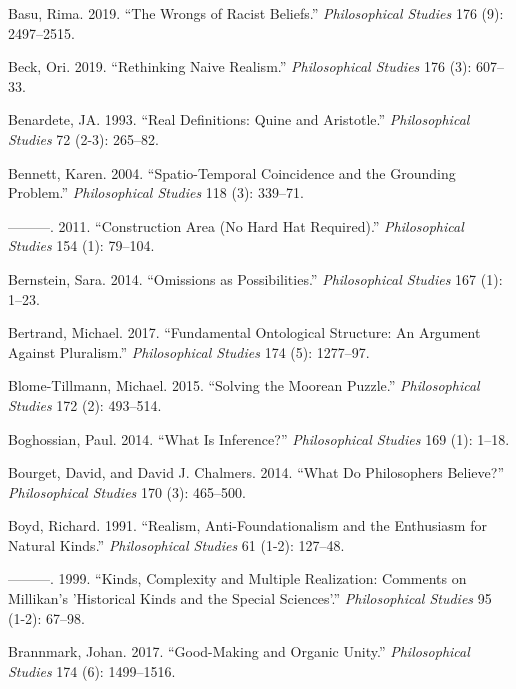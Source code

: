 \documentclass[
  10pt,
  letterpaper,
  DIV=11,
  numbers=noendperiod,
  twoside]{scrartcl}
\newlength{\cslhangindent}
\newenvironment{CSLReferences}[2] %
 {\begin{list}{}{%
  \setlength{\itemindent}{0pt}
  \setlength{\leftmargin}{0pt}
  \setlength{\parsep}{0pt}
  \ifodd #1
   \setlength{\leftmargin}{\cslhangindent}
   \setlength{\itemindent}{-1\cslhangindent}
  \fi
  \setlength{\itemsep}{#2\baselineskip}}}
 {\end{list}}
\begin{document}
\begin{CSLReferences}{1}{0}
Basu, Rima. 2019. {``The Wrongs of Racist Beliefs.''}
\emph{Philosophical Studies} 176 (9): 2497--2515.

Beck, Ori. 2019. {``Rethinking Naive Realism.''} \emph{Philosophical
Studies} 176 (3): 607--33.

Benardete, JA. 1993. {``Real Definitions: Quine and Aristotle.''}
\emph{Philosophical Studies} 72 (2-3): 265--82.

Bennett, Karen. 2004. {``Spatio-Temporal Coincidence and the Grounding
Problem.''} \emph{Philosophical Studies} 118 (3): 339--71.

---------. 2011. {``Construction Area (No Hard Hat Required).''}
\emph{Philosophical Studies} 154 (1): 79--104.

Bernstein, Sara. 2014. {``Omissions as Possibilities.''}
\emph{Philosophical Studies} 167 (1): 1--23.

Bertrand, Michael. 2017. {``Fundamental Ontological Structure: An
Argument Against Pluralism.''} \emph{Philosophical Studies} 174 (5):
1277--97.

Blome-Tillmann, Michael. 2015. {``Solving the Moorean Puzzle.''}
\emph{Philosophical Studies} 172 (2): 493--514.

Boghossian, Paul. 2014. {``What Is Inference?''} \emph{Philosophical
Studies} 169 (1): 1--18.

Bourget, David, and David J. Chalmers. 2014. {``What Do Philosophers
Believe?''} \emph{Philosophical Studies} 170 (3): 465--500.

Boyd, Richard. 1991. {``Realism, Anti-Foundationalism and the Enthusiasm
for Natural Kinds.''} \emph{Philosophical Studies} 61 (1-2): 127--48.

---------. 1999. {``Kinds, Complexity and Multiple Realization: Comments
on Millikan's 'Historical Kinds and the Special Sciences'.''}
\emph{Philosophical Studies} 95 (1-2): 67--98.

Brannmark, Johan. 2017. {``Good-Making and Organic Unity.''}
\emph{Philosophical Studies} 174 (6): 1499--1516.


\end{CSLReferences}
\end{document}
